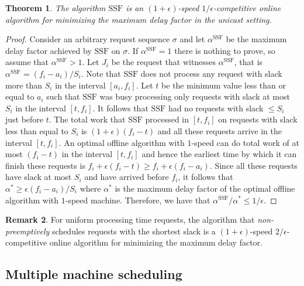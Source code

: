 \documentclass[10pt]{article}
\newtheorem{theorem}{Theorem}[section]
\theoremstyle{definition}
\newtheorem{remark}[theorem]{Remark}
\numberwithin{equation}{section}
\newcommand{\eps}{\epsilon}
\newcommand{\Algorithm}[1]{{\textrm{#1}}} %
\newcommand{\sug}{\Algorithm{SSF}} %
\begin{document}
\begin{theorem}
\label{thm:ssf-single-machine} The algorithm $\sug$ is an $(1 +
\eps)$-speed ${1/\eps}$-competitive online algorithm for minimizing the maximum delay factor in the unicast setting.
\end{theorem}
\begin{proof}
  Consider an arbitrary request sequence $\sigma$ and let $\alpha^\sug$ be
  the maximum delay factor achieved by $\sug$ on $\sigma$. If $\alpha^\sug
  = 1$ there is nothing to prove, so assume that $\alpha^\sug > 1$.  Let
  $J_i$ be the request that witnesses $\alpha^\sug$, that is $\alpha^\sug = (f_i
  - a_i)/S_i$. Note that $\sug$ does not process any request with slack
  more than $S_i$ in the interval $[a_i, f_i]$. Let $t$ be the minimum
  value less than or equal to $a_i$ such that $\sug$ was busy processing only
  requests with slack at most $S_i$ in the interval $[t, f_i]$. It
  follows that $\sug$ had no requests with slack $\le S_i$ just before
  $t$. The total work that $\sug$ processed in $[t,f_i]$ on requests
  with slack less than equal to $S_i$ is $(1+\eps)(f_i-t)$ and all
  these requests arrive in the interval $[t,f_i]$. An optimal offline
  algorithm with $1$-speed can do total work of at most $(f_i-t)$ in
  the interval $[t,f_i]$ and hence the earliest time by which it can
  finish these requests is $f_i + \eps (f_i-t) \ge f_i + \eps(f_i -
  a_i)$. Since all these requests have slack at most $S_i$ and have
  arrived before $f_i$, it follows that $\alpha^* \ge \eps(f_i -
  a_i)/S_i$ where $\alpha^*$ is the maximum delay factor of the
  optimal offline algorithm with $1$-speed machine. Therefore, we have
  that $\alpha^{\sug}/\alpha^* \le 1/\eps$.
\end{proof}

\begin{remark}
  For uniform processing time requests, the algorithm that \emph{non-preemptively} schedules requests with the shortest slack is a
  $(1+\eps)$-speed $2/\eps$-competitive online  algorithm for
  minimizing the maximum delay factor.
\end{remark}

\subsection{Multiple machine scheduling}
\label{unicast-multi}
\end{document}
